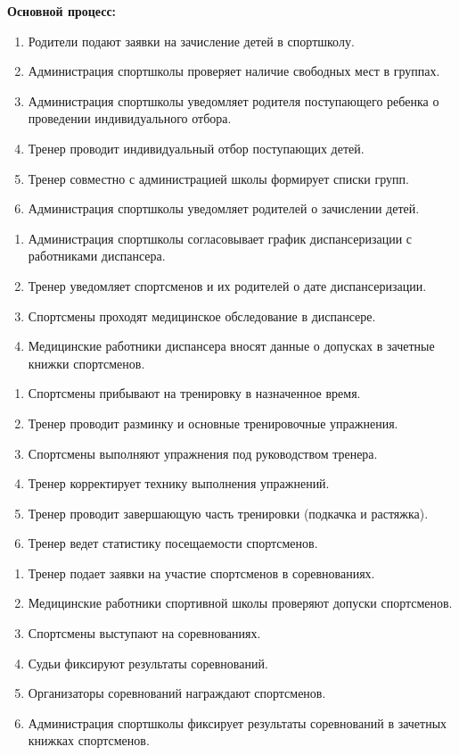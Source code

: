 \documentclass[12pt,a4paper,final]{article} %
\begin{document}
\par \textbf{Основной процесс:}
\begin{enumerate}[nosep, label=1.1.\arabic*]  
	\item Родители подают заявки на зачисление детей в спортшколу.
	\item Администрация спортшколы проверяет наличие свободных мест в группах.
	\item Администрация спортшколы уведомляет родителя поступающего ребенка о проведении индивидуального отбора.
	\item Тренер проводит индивидуальный отбор поступающих детей.
	\item Тренер совместно с администрацией школы формирует списки групп.
	\item Администрация спортшколы уведомляет родителей о зачислении детей.
\end{enumerate}
\begin{enumerate}[nosep, label=1.2.\arabic*]  
	\item Администрация спортшколы согласовывает график диспансеризации с работниками диспансера.
	\item Тренер уведомляет спортсменов и их родителей о дате диспансеризации.
	\item Спортсмены проходят медицинское обследование в диспансере.
	\item Медицинские работники диспансера вносят данные о допусках в зачетные книжки спортсменов.
\end{enumerate}
\begin{enumerate}[nosep, label=1.3.\arabic*]
	\item Спортсмены прибывают на тренировку в назначенное время.
	\item Тренер проводит разминку и основные тренировочные упражнения.
	\item Спортсмены выполняют упражнения под руководством тренера.
	\item Тренер корректирует технику выполнения упражнений.
	\item Тренер проводит завершающую часть тренировки (подкачка и растяжка).
	\item Тренер ведет статистику посещаемости спортсменов.
\end{enumerate}
\begin{enumerate}[nosep, label=1.4.\arabic*]  
	\item Тренер подает заявки на участие спортсменов в соревнованиях.
	\item Медицинские работники спортивной школы проверяют допуски спортсменов.
	\item Спортсмены выступают на соревнованиях.
	\item Судьи фиксируют результаты соревнований.
	\item Организаторы соревнований награждают спортсменов.
	\item Администрация спортшколы фиксирует результаты соревнований в зачетных книжках спортсменов.
\end{enumerate}
\end{document}

